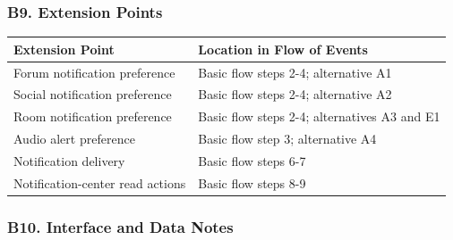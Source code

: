 \documentclass[12pt]{article}
\renewcommand{\baselinestretch}{1.5}
\begin{document}
\hypertarget{sec:b9-extension-points}{}
\subsubsection*{B9. Extension Points}
\par\medskip

\begingroup
\small
\renewcommand{\baselinestretch}{1.0}\selectfont
\renewcommand{\arraystretch}{1.15}
\setlength{\tabcolsep}{6pt}
\begin{longtable}{|>{\raggedright\arraybackslash}p{}|>{\raggedright\arraybackslash}p{}|}
\hline
\textbf{Extension Point} & \textbf{Location in Flow of Events} \\ \hline
\endhead
Forum notification preference & Basic flow steps 2-4; alternative A1 \\ \hline
Social notification preference & Basic flow steps 2-4; alternative A2 \\ \hline
Room notification preference & Basic flow steps 2-4; alternatives A3 and E1 \\ \hline
Audio alert preference & Basic flow step 3; alternative A4 \\ \hline
Notification delivery & Basic flow steps 6-7 \\ \hline
Notification-center read actions & Basic flow steps 8-9 \\ \hline
\end{longtable}
\endgroup
\par\medskip

\hypertarget{sec:b10-interface-and-data-notes}{}
\subsubsection*{B10. Interface and Data Notes}
\par\medskip
\end{document}
